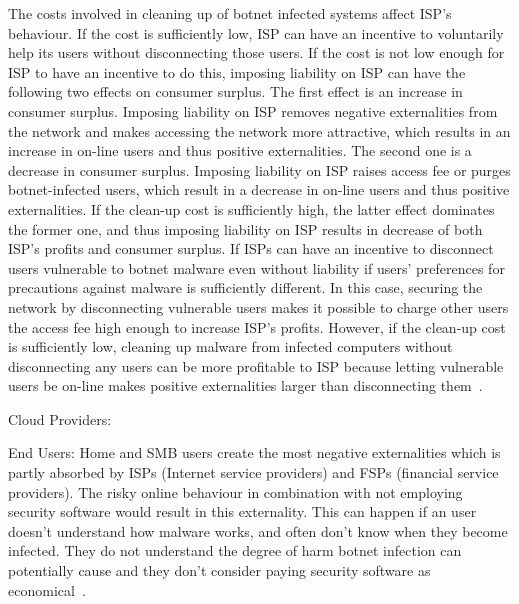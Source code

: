 The costs involved in cleaning up of botnet infected systems affect ISP’s behaviour. If the cost is sufficiently low, ISP can have an incentive to voluntarily help its users without disconnecting those users. If the cost is not low enough for ISP to have an incentive to do this, imposing liability on ISP can have the following two effects on consumer surplus. The first effect is an increase in consumer surplus. Imposing liability on ISP removes negative externalities from the network and makes accessing the network more attractive, which results in an increase in on-line users and thus positive externalities. The second one is a decrease in consumer surplus. Imposing liability on ISP raises access fee or purges botnet-infected users, which result in a decrease in on-line users and thus positive externalities. If the clean-up cost is sufficiently high, the latter effect dominates the former one, and thus imposing liability on ISP results in decrease of both ISP’s profits and consumer surplus. If ISPs can have an incentive to disconnect users vulnerable to botnet malware even without liability if users’ preferences for precautions against malware is sufficiently different. In this case, securing the network by disconnecting vulnerable users makes it possible to charge other users the access fee high enough to increase ISP’s profits. However, if the clean-up cost is sufficiently low, cleaning up malware from infected computers without disconnecting any users can be more profitable to ISP because letting vulnerable users be on-line makes positive externalities larger than disconnecting them~\cite{kinukawa2012should}.

Cloud Providers:



End Users:
Home and SMB users create the most negative externalities which is partly absorbed by ISPs (Internet service providers) and FSPs (financial service providers). The risky online behaviour in combination with not employing security software would result in this externality. This can happen  if an user doesn’t understand how malware works, and often don’t know when they become infected. They do not understand the degree of harm botnet infection can potentially cause and they don't consider paying security software as economical~\cite{asghari2010botnet}. 
